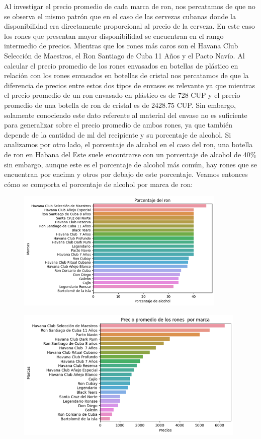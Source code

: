 \documentclass[a4paper,12pt]{article}
\begin{document}
		Al investigar el precio promedio de cada marca de ron, nos percatamos de que no se observa el mismo patrón que en el caso de las cervezas cubanas donde la disponibilidad era directamente proporcional al precio de la cerveza. En este caso los rones que presentan mayor disponibilidad se encuentran en el rango intermedio de precios. Mientras que los rones más caros son el Havana Club Selección de Maestros, el Ron Santiago de Cuba 11 Años y el Pacto Navío. Al calcular el precio promedio de los rones envasados en botellas de plástico en relación con los rones envasados en botellas de cristal nos percatamos de que la diferencia de precios entre estos dos tipos de envases es relevante ya que mientras el precio promedio de un ron envasado en plástico es de 728 CUP y el precio promedio de una botella de ron de cristal es de 2428.75 CUP. Sin embargo, solamente conociendo este dato referente al material del envase no es suficiente para generalizar sobre el precio promedio de ambos rones, ya que también depende de la cantidad de ml del recipiente y su porcentaje de alcohol. Si analizamos por otro lado, el porcentaje de alcohol en el caso del ron, una botella de ron en Habana del Este suele encontrarse con un porcentaje de alcohol de 40\% sin embargo, aunque este es el porcentaje de alcohol más común, hay rones que se encuentran por encima y otros por debajo de este porcentaje. Veamos entonces cómo se comporta el porcentaje de alcohol por marca de ron:
		
		\begin{figure}[h]
			\centering
			\includegraphics[width=10cm]{alcohol rum.png}
			\label{fig:Porcentaje de alcohol de los rones por marca}
		\end{figure}
		
		\begin{figure}[h]
			\centering
			\includegraphics[width=11cm]{rum prices.png}
			\label{fig:Precio promedio del ron por marca}
		\end{figure}
		
\end{document}
